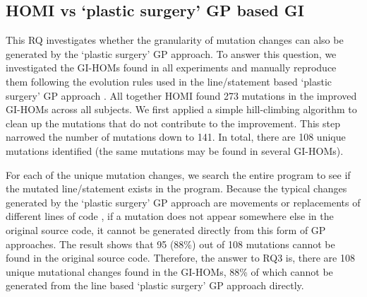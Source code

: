 \documentclass[oribibl]{llncs}
\begin{document}
{\subsection{HOMI vs `plastic surgery' GP based GI}
\label{sec_resstatic}


This RQ investigates whether the granularity of mutation changes can also be generated by the `plastic surgery' GP approach. To answer this question, we investigated the GI-HOMs found in all experiments and manually reproduce them following the evolution rules used in the line/statement based `plastic surgery' GP approach \cite{justyna2013, 6733370}. All together HOMI found  273 mutations in the improved GI-HOMs across all subjects. We first applied a simple hill-climbing algorithm to clean up the mutations that do not contribute to the improvement. This step narrowed the number of mutations down to 141. %
In total, there are 108 unique mutations identified (the same mutations may be found in several GI-HOMs).

For each of the unique mutation changes, we search the entire program to see if the mutated line/statement exists in the program.  Because the typical changes generated by the `plastic surgery' GP approach are movements or replacements of different lines of code \cite{justyna2013, 6733370}, if a mutation does not appear somewhere else in the original source code, it cannot be generated directly from this form of GP approaches. The result shows that 95 (88\%) out of 108 mutations cannot be found in the original source code. Therefore, the answer to RQ3 is, there are 108 unique mutational changes found in the GI-HOMs, 88\% of which cannot be generated from the line based `plastic surgery' GP approach directly.


}
\end{document}

